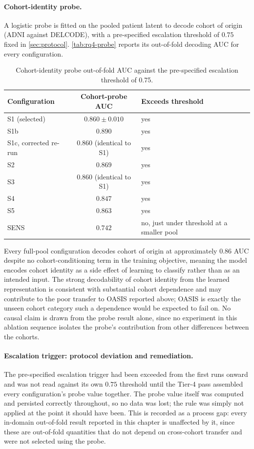 \paragraph{Cohort-identity probe.} A logistic probe is fitted on the pooled patient latent
to decode cohort of origin (\ac{ADNI} against \ac{DELCODE}), with a pre-specified escalation
threshold of $0.75$ fixed in \autoref{sec:protocol}. \autoref{tab:rq4-probe} reports its
out-of-fold decoding \ac{AUC} for every configuration.

\begin{table}[htbp]
\centering
\small
\caption{Cohort-identity probe out-of-fold \ac{AUC} against the pre-specified escalation
  threshold of 0.75.}
\label{tab:rq4-probe}
\begin{tabularx}{\textwidth}{@{}lcX@{}}
\toprule
Configuration & Cohort-probe \ac{AUC} & Exceeds threshold \\
\midrule
S1 (selected) & $0.860 \pm 0.010$ & yes \\
S1b & $0.890$ & yes \\
S1c, corrected re-run & $0.860$ (identical to S1) & yes \\
S2 & $0.869$ & yes \\
S3 & $0.860$ (identical to S1) & yes \\
S4 & $0.847$ & yes \\
S5 & $0.863$ & yes \\
SENS & $0.742$ & no, just under threshold at a smaller pool \\
\bottomrule
\end{tabularx}
\end{table}

Every full-pool configuration decodes cohort of origin at approximately 0.86 \ac{AUC} despite no
cohort-conditioning term in the training objective, meaning the model encodes cohort
identity as a side effect of learning to classify rather than as an intended input. The
strong decodability of cohort identity from the learned representation is consistent with
substantial cohort dependence and may contribute to the poor transfer to \ac{OASIS} reported
above; \ac{OASIS} is exactly the unseen cohort category such a dependence would be expected
to fail on. No causal claim is drawn from the probe result alone, since no experiment in
this ablation sequence isolates the probe's contribution from other differences between the cohorts.

\paragraph{Escalation trigger: protocol deviation and remediation.} The pre-specified
escalation trigger had been exceeded from the first runs onward and was not read
against its own $0.75$ threshold until the Tier-4 pass assembled every configuration's probe value
together. The probe value itself was computed and persisted correctly throughout, so no data
was lost; the rule was simply not applied at the point it should have been. This is recorded
as a process gap: every in-domain out-of-fold result reported in this chapter is unaffected
by it, since these are out-of-fold quantities that do not depend on cross-cohort transfer and
were not selected using the probe.

